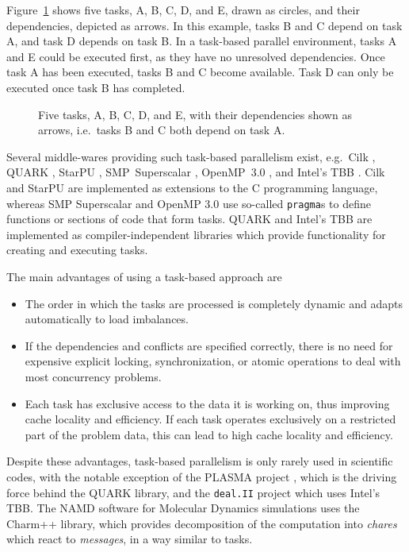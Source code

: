 \documentclass[final]{siamltex}
\newcommand{\fig}[1]
    {Figure~\ref{fig:#1}}
\begin{document}
\fig{TasksExample} shows five tasks, A, B, C, D, and E, drawn
as circles, and their dependencies, depicted as arrows.
In this example, tasks B and C depend on task A, and task D
depends on task B.
In a task-based parallel environment, tasks A and E could
be executed first, as they have no unresolved dependencies.
Once task A has been executed, tasks B and C become available.
Task D can only be executed once task B has completed.

\begin{figure}
    \centerline{}
    
    \caption{Five tasks, A, B, C, D, and E, with their dependencies
        shown as arrows, i.e.~tasks B and C both depend on task A.}
    \label{fig:TasksExample}
\end{figure}

Several middle-wares providing such task-based
parallelism exist, e.g.~Cilk \cite{ref:Blumofe1995}, QUARK \cite{ref:QUARK},
StarPU \cite{ref:Augonnet2011}, SMP~Superscalar \cite{ref:SMPSuperscalar},
OpenMP~3.0 \cite{ref:Duran2009}, and Intel's TBB \cite{ref:Reinders2007}.
Cilk and StarPU are implemented as extensions to the C programming
language, whereas SMP Superscalar and OpenMP 3.0 use so-called {\tt pragma}s
to define functions or sections of code that form tasks.
QUARK and Intel's TBB are implemented as compiler-independent
libraries which provide functionality for creating and executing
tasks.

The main advantages of using a task-based approach are
%
\begin{itemize}
    \item The order in which the tasks are processed is completely
        dynamic and adapts automatically to load imbalances.
    \item If the dependencies and conflicts are specified correctly,
        there is no need for expensive explicit locking, synchronization,
        or atomic operations to deal with most concurrency problems.
    \item Each task has exclusive access to the data it is working on,
        thus improving cache locality and efficiency.
        If each task operates exclusively on a restricted part of the
        problem data, this can lead to high cache locality and efficiency.
\end{itemize}
%
Despite these advantages, task-based parallelism is only rarely
used in scientific codes, with the notable exception of
the PLASMA project \cite{ref:Agullo2009}, which is the driving
force behind the QUARK library, and the {\tt deal.II} project
\cite{ref:Bangerth2007} which uses Intel's TBB.
The NAMD \cite{ref:Phillips2005} software for Molecular Dynamics simulations
uses the Charm++ \cite{ref:Kale1993} library, which provides
decomposition of the computation into {\em chares} which
react to {\em messages}, in a way similar to tasks.
\end{document}
